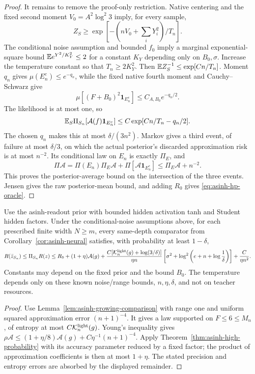 \begin{proof}
It remains to remove the proof-only restriction. Native centering and
the fixed second moment $V_0=A^2\log^2 3$ imply, for every sample,
\[
 Z_S\ge\exp[-(nV_0+\sum_iY_i^2)/T_n].
\]
The conditional noise assumption and bounded $f_0$ imply a marginal
exponential-square bound $\mathbb E e^{Y^2/K_Y^2}\le2$ for a constant
$K_Y$ depending only on $B_0,\sigma$. Increase the temperature
constant so that $T_n\ge2K_Y^2$. Then
$\mathbb E Z_S^{-1}\le\exp[C n/T_n]$.
Moment $q_n$ gives $\mu(E_n^c)\le e^{-q_n}$, while the fixed
native fourth moment and Cauchy--Schwarz give
\[
 \mu[(F+B_0)^2\mathbf1_{E_n^c}]
        \le C_{A,B_0}e^{-q_n/2}.
\]
The likelihood is at most one, so
\[
 \mathbb E_S\Pi_{S_n}[\mathcal A(f)\mathbf1_{E_n^c}]
       \le C\exp[C n/T_n-q_n/2].
\]
The chosen $q_n$ makes this at most $\delta/(3n^2)$.
Markov gives a third event, of failure at most $\delta/3$, on which
the actual posterior's discarded approximation risk is at most
$n^{-2}$. Its conditional law on $E_n$ is exactly $\Pi_E$, and
\[
 \Pi\mathcal A=\Pi(E_n)\Pi_E\mathcal A+
                   \Pi[\mathcal A\mathbf1_{E_n^c}]
              \le\Pi_E\mathcal A+n^{-2}.
\]
This proves the posterior-average bound on the intersection of the
three events. Jensen gives the raw posterior-mean bound, and adding
$R_0$ gives \eqref{eq:asinh-hp-oracle}.
\end{proof}

\begin{corollary}
\label{cor:asinh-neural-hp}
Use the asinh-readout prior with bounded hidden activation tanh and
Student hidden factors. Under the conditional-noise assumptions above,
for each prescribed finite width $N\ge m$, every same-depth comparator
from Corollary~\ref{cor:asinh-neural} satisfies, with probability at
least $1-\delta$,
\[
 R(\bar z_{S_n})\le\Pi_{S_n}R(z)
 \le R_0+(1+\eta)\mathcal A(g)
   +\frac{C[\mathcal K_n^{\rm light}(g)+\log(3/\delta)]}{\eta n}
       \left[\sigma^2+
          \log^2\left(e+n+\log\frac1\delta\right)\right]
   +\frac{C}{\eta n^2}.
\]
Constants may depend on the fixed prior and the bound $B_0$.
The temperature depends only on these known noise/range bounds,
$n,\eta,\delta$, and not on teacher resources.
\end{corollary}
\begin{proof}
Use Lemma~\ref{lem:asinh-growing-comparison} with range one and
uniform squared approximation error $(n+1)^{-4}$. It gives a law
supported on $F\le6\le M_n$, of entropy at most
$C\mathcal K_n^{\rm light}(g)$. Young's inequality gives
$\rho\mathcal A\le(1+\eta/8)\mathcal A(g)
+C\eta^{-1}(n+1)^{-4}$.
Apply Theorem~\ref{thm:asinh-high-probability} with its accuracy
parameter reduced by a fixed factor; the product of approximation
coefficients is then at most $1+\eta$. The stated precision and
entropy errors are absorbed by the displayed remainder.
\end{proof}
